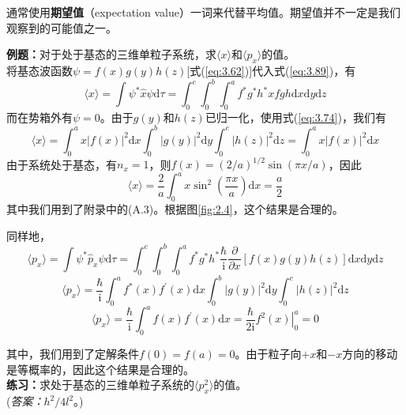 	通常使用\textbf{期望值}（expectation value）一词来代替平均值。期望值并不一定是我们观察到的可能值之一。
	\begin{examplebox}
		\textbf{例题：}对于处于基态的三维单粒子系统，求$\langle x \rangle$和$\langle p_x \rangle$的值。\\
		
		将基态波函数$\psi=f\left(x\right)g\left(y\right)h\left(z\right)$[式(\ref{eq:3.62})]代入式(\ref{eq:3.89})，有
		\begin{equation*}
			\langle x \rangle = \int \psi^{\ast}\hat{x}\psi \mathrm{d}\tau = \int_{0}^{c}\int_{0}^{b}\int_{0}^{a}f^{\ast}g^{\ast}h^{\ast} x fgh\mathrm{d}x\mathrm{d}y\mathrm{d}z
		\end{equation*}
		而在势箱外有$\psi = 0$。由于$g\left(y\right)$和$h\left(z\right)$已归一化，使用式(\ref{eq:3.74})，我们有
		\begin{equation*}
			\langle x \rangle = \int_{0}^{a} x\left|f\left(x\right)\right|^{2}\mathrm{d}x \int_{0}^{b}\left|g\left(y\right)\right|^{2}\mathrm{d}y \int_{0}^{c}\left|h\left(z\right)\right|^{2}\mathrm{d}z = \int_{0}^{a} x\left|f\left(x\right)\right|^{2}\mathrm{d}x
		\end{equation*}
		由于系统处于基态，有$n_x=1$，则$f\left(x\right) = \left(2/a\right)^{1/2}\sin\left(\pi x/a\right)$，因此
		\begin{equation}
			\langle x \rangle = \frac{2}{a}\int_{0}^{a} x\sin^{2}\left(\frac{\pi x}{a}\right)\mathrm{d}x = \frac{a}{2}
			\label{eq:3.91}
		\end{equation}
		其中我们用到了附录中的(A.3)。根据图\ref{fig:2.4}，这个结果是合理的。

		同样地，
		\begin{equation*}
			\langle p_x \rangle = \int \psi^{\ast}\hat{p}_x\psi \mathrm{d}\tau = \int_{0}^{c}\int_{0}^{b}\int_{0}^{a}f^{\ast}g^{\ast}h^{\ast} \frac{\hbar}{\mathrm{i}}\frac{\partial}{\partial x}\left[f\left(x\right)g\left(y\right)h\left(z\right)\right]\mathrm{d}x\mathrm{d}y\mathrm{d}z
		\end{equation*}
		\begin{equation*}
			\langle p_x \rangle = \frac{\hbar}{\mathrm{i}}\int_{0}^{a}f^{\ast}\left(x\right)f^{\prime}\left(x\right)\mathrm{d}x \int_{0}^{b}\left|g\left(y\right)\right|^{2}\mathrm{d}y \int_{0}^{c}\left|h\left(z\right)\right|^{2}\mathrm{d}z
		\end{equation*}
		\begin{equation}
			\langle p_x \rangle = \frac{\hbar}{\mathrm{i}}\int_{0}^{a}f\left(x\right)f^{\prime}\left(x\right)\mathrm{d}x = \frac{\hbar}{2\mathrm{i}}\left. f^2\left(x\right) \right|_{0}^{a} = 0
			\label{eq:3.92}
		\end{equation}

		其中，我们用到了定解条件$f\left(0\right)=f\left(a\right)=0$。由于粒子向$+x$和$-x$方向的移动是等概率的，因此这个结果是合理的。\\
		
		\textbf{练习：}求处于基态的三维单粒子系统的$\langle p_x^2 \rangle$的值。\\
		(\textit{答案：}$h^2/4l^2$。)
	\end{examplebox}

